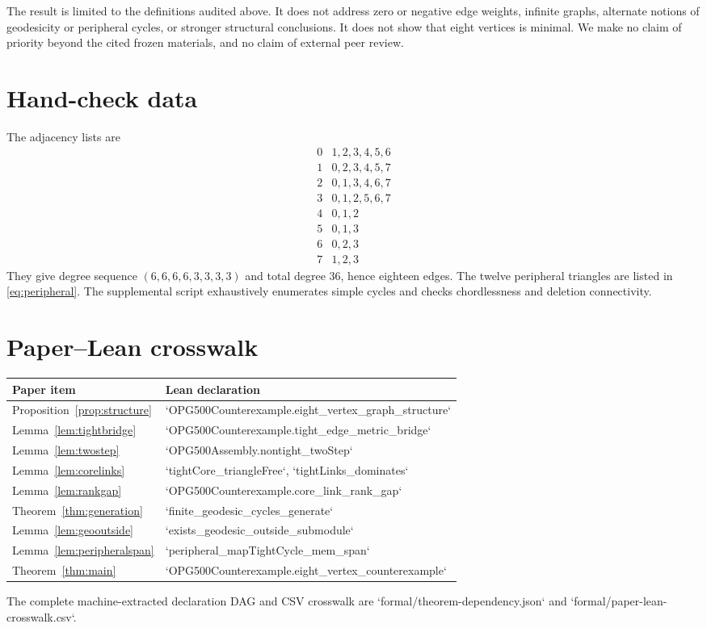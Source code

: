 \documentclass[11pt]{amsart}
\theoremstyle{definition}
\begin{document}
The result is limited to the definitions audited above.  It does not address zero or negative edge weights, infinite graphs, alternate notions of geodesicity or peripheral cycles, or stronger structural conclusions.  It does not show that eight vertices is minimal.  We make no claim of priority beyond the cited frozen materials, and no claim of external peer review.

\appendix
\section{Hand-check data}

The adjacency lists are
\[
\begin{array}{c|l}
0&1,2,3,4,5,6\\
1&0,2,3,4,5,7\\
2&0,1,3,4,6,7\\
3&0,1,2,5,6,7\\
4&0,1,2\\
5&0,1,3\\
6&0,2,3\\
7&1,2,3
\end{array}
\]
They give degree sequence $(6,6,6,6,3,3,3,3)$ and total degree $36$, hence eighteen edges.  The twelve peripheral triangles are listed in \eqref{eq:peripheral}.  The supplemental script exhaustively enumerates simple cycles and checks chordlessness and deletion connectivity.

\section{Paper--Lean crosswalk}

\begin{center}\small
\begin{tabular}{@{}ll@{}}
\toprule
Paper item & Lean declaration \\
\midrule
Proposition~\ref{prop:structure} & `OPG500Counterexample.eight\_vertex\_graph\_structure`\\
Lemma~\ref{lem:tightbridge} & `OPG500Counterexample.tight\_edge\_metric\_bridge`\\
Lemma~\ref{lem:twostep} & `OPG500Assembly.nontight\_twoStep`\\
Lemma~\ref{lem:corelinks} & `tightCore\_triangleFree`, `tightLinks\_dominates`\\
Lemma~\ref{lem:rankgap} & `OPG500Counterexample.core\_link\_rank\_gap`\\
Theorem~\ref{thm:generation} & `finite\_geodesic\_cycles\_generate`\\
Lemma~\ref{lem:geooutside} & `exists\_geodesic\_outside\_submodule`\\
Lemma~\ref{lem:peripheralspan} & `peripheral\_mapTightCycle\_mem\_span`\\
Theorem~\ref{thm:main} & `OPG500Counterexample.eight\_vertex\_counterexample`\\
\bottomrule
\end{tabular}
\end{center}
The complete machine-extracted declaration DAG and CSV crosswalk are `formal/theorem-dependency.json` and `formal/paper-lean-crosswalk.csv`.
\end{document}
